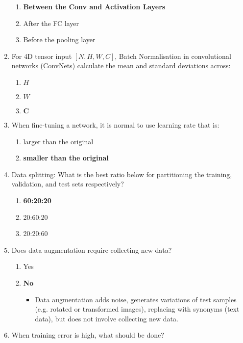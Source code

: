 \documentclass{report}
\numberwithin{equation}{section}
\begin{document}
\begin{enumerate}
    \begin{enumerate}[label=\alph*.]
        \item \textbf{Between the Conv and Activation Layers}
        \item After the FC layer
        \item Before the pooling layer
    \end{enumerate}
    \item For 4D tensor input $[N,H,W,C]$, Batch Normalisation in convolutional networks (ConvNets) calculate the mean and standard deviations across:
    \begin{enumerate}[label=\alph*.]
        \item $H$
        \item $W$
        \item $\textbf{C}$
    \end{enumerate}
    \item When fine-tuning a network, it is normal to use learning rate that is:
    \begin{enumerate}[label=\alph*.]
        \item larger than the original
        \item \textbf{smaller than the original}
    \end{enumerate}
    \item Data splitting: What is the best ratio below for partitioning the training, validation, and test sets respectively?
    \begin{enumerate}[label=\alph*.]
        \item \textbf{60:20:20}
        \item 20:60:20
        \item 20:20:60
    \end{enumerate}
    \item Does data augmentation require collecting new data?
    \begin{enumerate}[label=\alph*.]
        \item Yes
        \item \textbf{No}
        \begin{itemize}
            \item Data augmentation adds noise, generates variations of test samples (e.g. rotated or transformed images), replacing with synonyms (text data), but does not involve collecting new data.
        \end{itemize}
    \end{enumerate}
    \item When training error is high, what should be done?

\end{enumerate}
\end{document}
